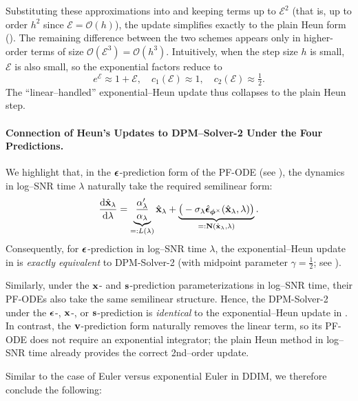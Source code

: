 Substituting these approximations into  and keeping terms 
up to $\mathcal{E}^2$ (that is, up to order $h^2$ since $\mathcal{E}=\mathcal{O}(h)$),
the update simplifies exactly to the plain Heun form ().  
The remaining difference between the two schemes appears only in higher-order terms 
of size $\mathcal{O}(\mathcal{E}^3)=\mathcal{O}(h^3)$.  
Intuitively, when the step size $h$ is small, $\mathcal{E}$ is also small, so the exponential factors 
reduce to 
\[
e^{\mathcal{E}} \approx 1+\mathcal{E},\quad 
c_1(\mathcal{E}) \approx 1,\quad c_2(\mathcal{E}) \approx \tfrac{1}{2}.
\]
The ``linear–handled'' exponential–Heun update thus collapses to the plain Heun step.

\paragraph{Connection of Heun’s Updates to DPM–Solver-2 Under the Four Predictions.}
We highlight that, in the ${\bm{\epsilon}}$-prediction form of the PF-ODE (see ), 
the dynamics in log–SNR time $\lambda$ naturally take the required semilinear form:
\[
\frac{\mathop{}\!\mathrm{d} \hat{{\mathbf{x}}}_\lambda}{\mathop{}\!\mathrm{d} \lambda}
= \underbrace{\frac{\alpha_\lambda'}{\alpha_\lambda}}_{=:L(\lambda)} \hat{{\mathbf{x}}}_\lambda
+
\underbrace{\big(- \sigma_\lambda \hat{\bm{\epsilon}}_{\bm{\phi}^\times}(\hat{{\mathbf{x}}}_\lambda,\lambda)\big)}_{=:{\mathbf{N}}(\hat{{\mathbf{x}}}_\lambda,\lambda)}.
\]
Consequently, for ${\bm{\epsilon}}$-prediction in log–SNR time $\lambda$, the exponential–Heun update 
in  is \emph{exactly equivalent} to DPM-Solver-2 
(with midpoint parameter $\gamma=\tfrac{1}{2}$; see ).

Similarly, under the ${\mathbf{x}}$- and ${\mathbf{s}}$-prediction parameterizations in log–SNR time, 
their PF-ODEs also take the same semilinear structure. 
Hence, the DPM-Solver-2 under the ${\bm{\epsilon}}$-, ${\mathbf{x}}$-, or ${\mathbf{s}}$-prediction 
is \emph{identical} to the exponential–Heun update in . In contrast, the ${\mathbf{v}}$-prediction form naturally removes the linear term, 
so its PF-ODE does not require an exponential integrator; 
the plain Heun method in log–SNR time already provides the correct 2nd–order update.

Similar to the case of Euler versus exponential Euler in DDIM, we therefore conclude the following: 




